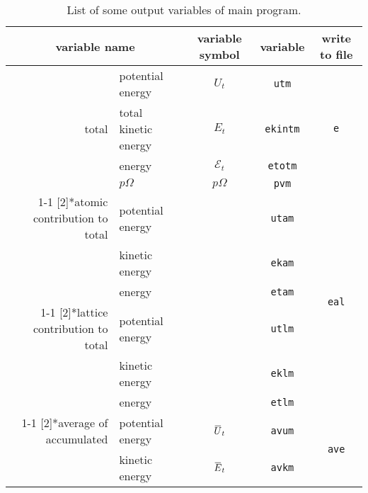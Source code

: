 \begin{table}[h]
 \centering
 \caption{List of some output variables of main program.}
 \begin{tabular}{@{}rlccc@{}}
  \toprule
  \multicolumn{2}{c}{variable name} & variable symbol & variable & write to file \\
  \midrule
  \multirow{4}[2]{*}{total}                                                         & potential energy     & $U_t$           & \texttt{utm}    & \multirow{4}[2]{*}{\texttt{e}}   \\
                                                                                    & total kinetic energy & $E_t$           & \texttt{ekintm} &                                  \\
                                                                                    & energy               & $\mathscr{E}_t$ & \texttt{etotm}  &                                  \\
                                                                                    & $p \Omega$           & $p \Omega$      & \texttt{pvm}    &                                  \\
  \cmidrule{1-1}\cmidrule{4-5}    \multirow{3}[2]{*}{atomic contribution to total}  & potential energy     &                 & \texttt{utam}   & \multirow{6}[4]{*}{\texttt{eal}} \\
                                                                                    & kinetic energy       &                 & \texttt{ekam}   &                                  \\
                                                                                    & energy               &                 & \texttt{etam}   &                                  \\
  \cmidrule{1-1}\cmidrule{4-4}    \multirow{3}[2]{*}{lattice contribution to total} & potential energy     &                 & \texttt{utlm}   &                                  \\
                                                                                    & kinetic energy       &                 & \texttt{eklm}   &                                  \\
                                                                                    & energy               &                 & \texttt{etlm}   &                                  \\
  \cmidrule{1-1}\cmidrule{4-5}    \multirow{2}[2]{*}{average of accumulated}        & potential energy     & $\mean{U}_t$    & \texttt{avum}   & \multirow{2}[2]{*}{\texttt{ave}} \\
                                                                                    & kinetic energy       & $\mean{E}_t$    & \texttt{avkm}   &                                  \\
  \bottomrule
 \end{tabular}
 \label{tab:lstvar}%
\end{table}%

